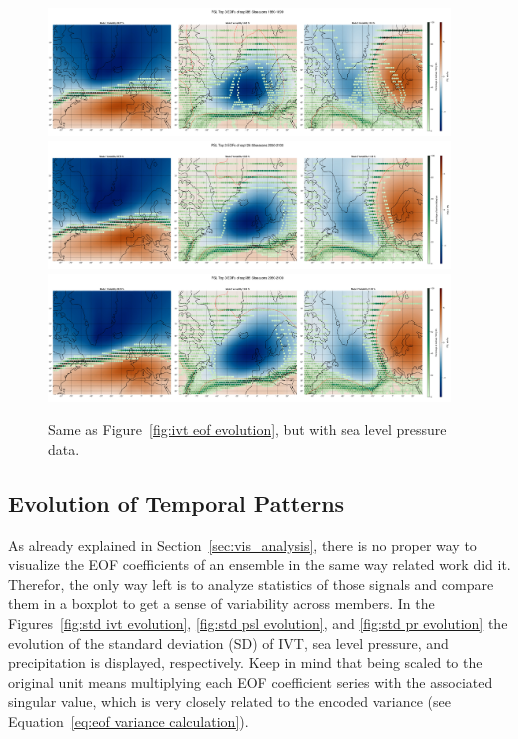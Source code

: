 \begin{figure}
  \begin{center}
    \includegraphics[width=0.95\textwidth]{figures/psl_spat_patterns_hexbin_18501899_ssp585_50seasons.png}
    \includegraphics[width=0.95\textwidth]{figures/psl_spat_patterns_hexbin_20502100_ssp126_50seasons.png}
    \includegraphics[width=0.95\textwidth]{figures/psl_spat_patterns_hexbin_20502100_ssp585_50seasons.png}
  \end{center}
  \caption{Same as Figure~\ref{fig:ivt eof evolution}, but with sea level pressure data.}\label{fig:psl eof evolution}
\end{figure}


\subsection{Evolution of Temporal Patterns}


As already explained in Section~\ref{sec:vis_analysis}, there is no proper way to visualize the EOF coefficients of an ensemble in the same way related work did it. 
Therefor, the only way left is to analyze statistics of those signals and compare them in a boxplot to get a sense of variability across members. 
In the Figures~\ref{fig:std ivt evolution}, \ref{fig:std psl evolution}, and \ref{fig:std pr evolution} the evolution of the standard deviation (SD) of IVT, sea level pressure, and precipitation is displayed, respectively. 
Keep in mind that being scaled to the original unit means multiplying each EOF coefficient series with the associated singular value, which is very closely related to the encoded variance (see Equation~\ref{eq:eof variance calculation}). 


